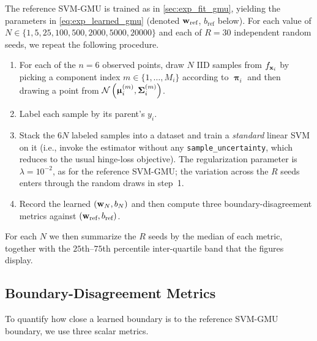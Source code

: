 \documentclass[11pt, letterpaper]{article}
\newcommand{\bSigma}{\vb{\Sigma}}
\newcommand{\bpi}{\boldsymbol{\uppi}}
\newcommand{\bmu}{\boldsymbol{\upmu}}
\newcommand{\Norm}{\mathcal{N}}
\begin{document}
The reference SVM-GMU is trained as in \cref{sec:exp_fit_gmu}, yielding the parameters in \cref{eq:exp_learned_gmu} (denoted $\vb{w}_{\text{ref}}$, $b_{\text{ref}}$ below). For each value of $N \in \{1, 5, 25, 100, 500, 2000, 5000, 20000\}$ and each of $R = 30$ independent random seeds, we repeat the following procedure.
\begin{enumerate}[leftmargin=2em]
    \item For each of the $n = 6$ observed points, draw $N$ IID samples from $f_{\vb{x}_i}$ by picking a component index $m \in \{1, \ldots, M_i\}$ according to $\bpi_i$ and then drawing a point from $\Norm\left(\bmu_i^{(m)}, \bSigma_i^{(m)}\right)$.
    \item Label each sample by its parent's $y_i$.
    \item Stack the $6N$ labeled samples into a dataset and train a \emph{standard} linear SVM on it (i.e., invoke the estimator without any \texttt{sample\_uncertainty}, which reduces to the usual hinge-loss objective). The regularization parameter is $\lambda = 10^{-2}$, as for the reference SVM-GMU; the variation across the $R$ seeds enters through the random draws in step~1.
    \item Record the learned $(\vb{w}_N, b_N)$ and then compute three boundary-disagreement metrics against $(\vb{w}_{\text{ref}}, b_{\text{ref}})$.
\end{enumerate}
For each $N$ we then summarize the $R$ seeds by the median of each metric, together with the $25$th--$75$th percentile inter-quartile band that the figures display.

\subsection{Boundary-Disagreement Metrics}

To quantify how close a learned boundary is to the reference SVM-GMU boundary, we use three scalar metrics.
\end{document}
